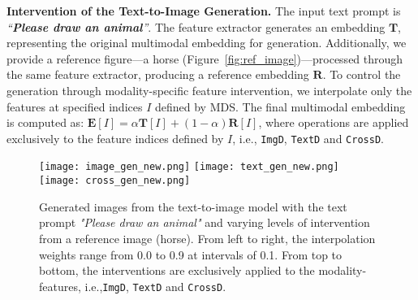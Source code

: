 \textbf{Intervention of the Text-to-Image Generation.} 
The input text prompt is \textit{“\textbf{Please draw an animal}”}. The feature extractor generates an embedding $\mathbf{T}$, representing the original multimodal embedding for generation. Additionally, we provide a reference figure—a horse (Figure~\ref{fig:ref_image})—processed through the same feature extractor, producing a reference embedding $\mathbf{R}$. To control the generation through modality-specific feature intervention, we interpolate only the features at specified indices $I$ defined by MDS. The final multimodal embedding is computed as:
$\mathbf{E}[I] = \alpha \mathbf{T}[I] + (1 - \alpha) \mathbf{R}[I]$, where operations are applied exclusively to the feature indices defined by $I$, i.e., \texttt{ImgD}, \texttt{TextD} and \texttt{CrossD}.

\begin{figure*}[h]
    \centering 
    \texttt{[image: image\_gen\_new.png]}
    \texttt{[image: text\_gen\_new.png]}
    \texttt{[image: cross\_gen\_new.png]}
    \caption{Generated images from the text-to-image model with the text prompt \textit{"Please draw an animal"} and varying levels of intervention from a reference image (horse). From left to right, the interpolation weights range from 0.0 to 0.9 at intervals of 0.1. From top to bottom, the interventions are exclusively applied to the modality-features, i.e.,\texttt{ImgD}, \texttt{TextD} and \texttt{CrossD}.}
    \label{fig:mm_gen}
\end{figure*}

